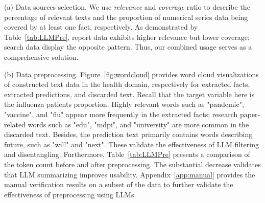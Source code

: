 (a) Data sources selection. We use \textit{relevance} and \textit{coverage} ratio to describe the percentage of relevant texts and the proportion of numerical series data being covered by at least one fact, respectively. As demonstrated by Table~\ref{tab:LLMPre}, report data exhibits higher relevance but lower coverage; search data display the opposite pattern. Thus, our combined usage serves as a comprehensive solution.

(b) Data preprocessing. Figure~\ref{fig:wordcloud} provides word cloud visualizations of constructed text data in the health domain, respectively for extracted facts, extracted predictions, and discarded text. Recall that the target variable here is the influenza patients proportion.  Highly relevant words such as "pandemic", "vaccine", and "flu" appear more frequently in the extracted facts; research paper-related words such as "edu", "mdpi", and "university" are more common in the discarded text. Besides, the prediction text primarily contains words describing future, such as "will" and "next". These validate the effectiveness of LLM filtering and disentangling. Furthermore, Table~\ref{tab:LLMPre} presents a comparison of the token count before and after preprocessing. The substantial decrease validates that LLM summarizing improves usability. Appendix~\ref{app:manual} provides the manual verification results on a subset of the data to further validate the effectiveness of preprocessing using LLMs.

\begin{table}[]
\centering
\caption{Statistics for text data. Relevance indicates the percentage of text data with relevant content. Coverage describes the proportion of numerical series data being covered by at least one fact. Details are provided in Appendix \ref{app:text_statistics}. The statistics highlight the need for both reports and search data.}

\label{tab:LLMPre}
\end{table}


